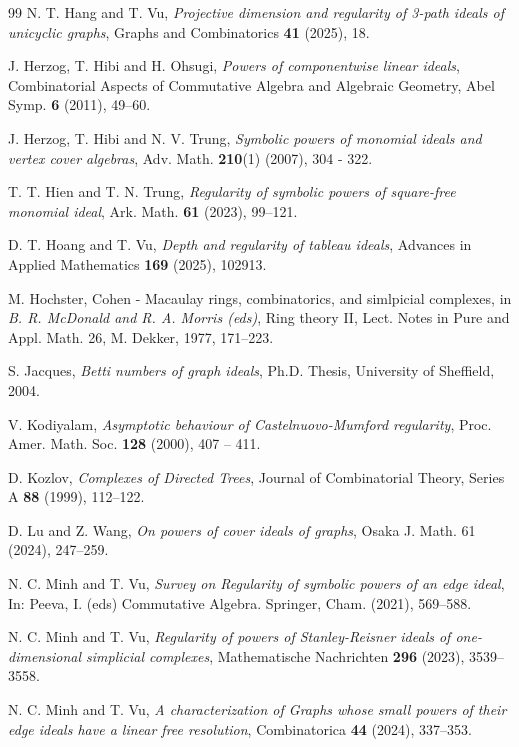 \documentclass[12pt,amscd]{amsart}
\theoremstyle{definition}
\begin{document}
\begin{thebibliography}{99}
 N. T. Hang and T. Vu, {\it Projective dimension and regularity of 3-path ideals of unicyclic graphs}, Graphs and Combinatorics {\bf 41} (2025), 18.


 J. Herzog, T. Hibi and H. Ohsugi, {\it Powers of componentwise linear ideals}, Combinatorial Aspects of Commutative Algebra and Algebraic Geometry, Abel Symp. {\bf 6} (2011), 49--60.


 J. Herzog, T. Hibi and N. V. Trung, {\it Symbolic powers of monomial ideals and vertex cover algebras},  Adv. Math. {\bf 210}(1) (2007), 304 - 322.



 T. T. Hien and T. N. Trung, {\it Regularity of symbolic powers of square-free monomial ideal}, Ark. Math. {\bf 61} (2023), 99--121.



 D. T. Hoang and T. Vu, {\em Depth and regularity of tableau ideals}, Advances in Applied Mathematics {\bf 169} (2025), 102913.


 M. Hochster, Cohen - Macaulay rings, combinatorics, and simlpicial complexes, in {\it B. R. McDonald and R. A. Morris (eds)}, Ring theory II, Lect. Notes in Pure and Appl. Math. 26, M. Dekker, 1977, 171--223.  



 S. Jacques, {\it Betti numbers of graph ideals}, Ph.D. Thesis, University of Sheffield, 2004.

 V. Kodiyalam, {\it Asymptotic behaviour of Castelnuovo-Mumford regularity}, Proc. Amer. Math. Soc. {\bf 128} (2000), 407 -- 411.


 D. Kozlov, \emph{Complexes of Directed Trees}, Journal of Combinatorial Theory, Series A \textbf{88} (1999), 112--122.


 D. Lu and Z. Wang, {\it On powers of cover ideals of graphs}, Osaka J. Math. 61 (2024), 247--259.


 N. C. Minh and T. Vu, {\it Survey on Regularity of symbolic powers of an edge ideal}, In: Peeva, I. (eds) Commutative Algebra. Springer, Cham. (2021), 569--588.

 N. C. Minh and T. Vu, {\it Regularity of powers of Stanley-Reisner ideals of one-dimensional simplicial complexes}, Mathematische Nachrichten {\bf 296} (2023), 3539--3558.


 N. C. Minh and T. Vu, {\it A characterization of Graphs whose small powers of their edge ideals have a linear free resolution}, Combinatorica {\bf 44} (2024), 337--353.


\end{thebibliography}
\end{document}
